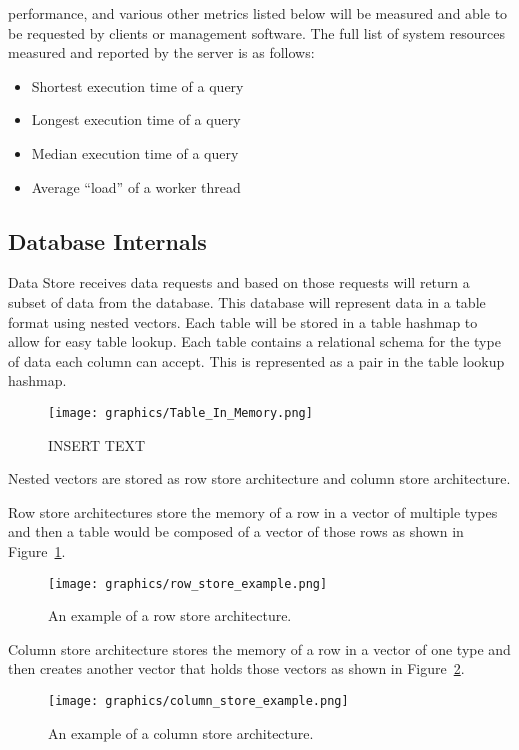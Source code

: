 \documentclass[letterpaper, 12pt]{article}
\begin{document}
performance, and various other metrics listed below will be measured and able to be
requested by clients or management software. The full list of system resources measured
and reported by the server is as follows:
\begin{itemize}
 \item Shortest execution time of a query
 \item Longest execution time of a query
 \item Median execution time of a query
 \item Average ``load'' of a worker thread
\end{itemize}
\par\vspace{\baselineskip}

\subsection{Database Internals}
Data Store receives data requests and based on those requests will return a subset of data from
the database. This database will represent data in a table format using nested vectors. Each table
will be stored in a table hashmap to allow for easy table lookup. Each table contains a relational
schema for the type of data each column can accept. This is represented as a pair in the table
lookup hashmap.

\begin{figure}
  \centering
  \texttt{[image: graphics/Table\_In\_Memory.png]}
  \caption{INSERT TEXT}
\end{figure}

Nested vectors are stored as row store architecture and column store architecture.

Row store architectures store the memory of a row in a vector of multiple types and then
a table would be composed of a vector of those rows as shown in Figure~\ref{fig:row_store_ex}.
\begin{figure}
  \centering
  \texttt{[image: graphics/row\_store\_example.png]}
  \label{fig:row_store_ex}
  \caption{An example of a row store architecture.}
\end{figure}

Column store architecture stores the memory of a row in a vector of one type and then 
creates another vector that holds those vectors as shown in Figure~\ref{fig:column_store_ex}.
\begin{figure}
  \centering
  \texttt{[image: graphics/column\_store\_example.png]}
  \label{fig:column_store_ex}
  \caption{An example of a column store architecture.}
\end{figure}
\end{document}
